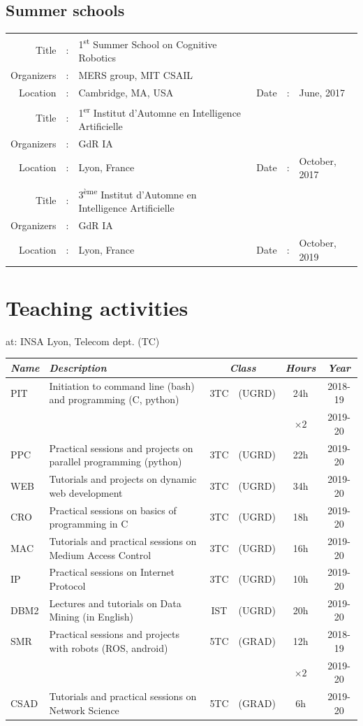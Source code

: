 \documentclass[a4paper,11pt]{article}
\newcommand{\useicon}[1]{\raisebox{-3pt}{\texttt{[image: ./icons/\#1.png]}}}
\begin{document}
\subsection*{Summer schools}
\centering
\begin{tabular}{r c l r c l}
	Title &: &1\textsuperscript{st} Summer School on Cognitive Robotics \\
	Organizers &: &MERS group, MIT CSAIL \\
	Location &: &Cambridge, MA, USA &Date &: &June, 2017 \\
	\hline
	Title &: &1\textsuperscript{er} Institut d'Automne en Intelligence Artificielle \\
	Organizers &: &GdR IA \\
	Location &: &Lyon, France       &Date &: &October, 2017 \\
	\hline
	Title &: &3\textsuperscript{{\`e}me} Institut d'Automne en Intelligence Artificielle \\
	Organizers &: &GdR IA \\
	Location &: &Lyon, France       &Date &: &October, 2019 \\
\end{tabular}
\flushleft

\clearpage
\section*{\useicon{teach} Teaching activities}
\flushright
at: INSA Lyon, Telecom dept. (TC)
\flushleft
\begin{tabularx}{\textwidth}{l X c c c c}
	\itshape Name &\itshape Description &\multicolumn{2}{c}{\itshape Class} &\itshape Hours &\itshape Year \\
	\hline
	PIT  &Initiation to command line (bash) and programming (C, python)
		&3TC &(UGRD) &24h        &2018-19 \\
		&&&          &$\times 2$ &2019-20 \\
	PPC  &Practical sessions and projects on parallel programming (python)
		&3TC &(UGRD) &22h &2019-20 \\
	WEB  &Tutorials and projects on dynamic web development
		&3TC &(UGRD) &34h &2019-20 \\
	CRO  &Practical sessions on basics of programming in C
		&3TC &(UGRD) &18h &2019-20 \\
	MAC  &Tutorials and practical sessions on Medium Access Control
		&3TC &(UGRD) &16h &2019-20 \\
	IP   &Practical sessions on Internet Protocol
		&3TC &(UGRD) &10h &2019-20 \\
	DBM2 &Lectures and tutorials on Data Mining (in English)
		&IST &(UGRD) &20h &2019-20 \\
	SMR  &Practical sessions and projects with robots (ROS, android)
		&5TC &(GRAD) &12h        &2018-19 \\
		&&&          &$\times 2$ &2019-20 \\
	CSAD &Tutorials and practical sessions on Network Science
		&5TC &(GRAD) &6h  &2019-20 \\
\end{tabularx}
\end{document}
